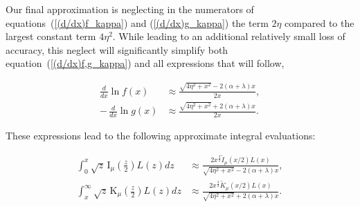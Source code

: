 \documentclass[draft]{agujournal2019}
\begin{document}
{Our final approximation is neglecting in the numerators of
equations~(\ref{(d/dx)f_kappa}) and (\ref{(d/dx)g_kappa}) the term 
$2\eta$ compared to the largest constant term $4\eta^{2}$. While leading to an
additional relatively small loss of accuracy, this neglect will significantly simplify
both equation~(\ref{(d/dx)f,g_kappa}) and all expressions that will follow,
\begin{linenomath*}
\begin{subequations}
\label{(d/dx)f,g_kappa_simplified}
\begin{align}
\frac{d}{dx}\ln f\left(  x\right)   &  \approx\frac{\sqrt{4\eta^{2}+x^{2}}-
2\left(  \alpha+\lambda\right)  x}{2x},\label{(d/dx)f_kappa_simplified}\\
-\,\frac{d}{dx}\ln g\left(  x\right)   &  \approx\frac{\sqrt{4\eta^{2}+x^{2}}+
2\left(  \alpha+\lambda\right)  x}{2x}. 
\label{(d/dx)g_kappa_simplified}
\end{align}
\end{subequations}
\end{linenomath*}
These expressions lead to the following approximate integral evaluations:
\begin{linenomath*}
\begin{align*}
\int_{0}^{x}\sqrt{z}\,\mathrm{I}_{\mu}\left(  \frac{z}{2}\right)  L(z)dz  &
\approx\frac{2x^{\frac{3}{2}}\tilde{I}_{\mu}(x/2)
L(x)}{\sqrt{4\eta^{2}+x^{2}}-2\left(  \alpha+\lambda\right)  x},\\
\int_{x}^{\infty}\sqrt{z}\,\mathrm{K}_{\mu}\left(  \frac{z}{2}\right)  L(z)dz
&  \approx\frac{2x^{\frac{3}{2}}\tilde{K}_{\mu}(x/2)
L(x)}{\sqrt{4\eta^{2}+x^{2}}+2\left(  \alpha+\lambda\right)  x}.
\end{align*}
\end{linenomath*}

}
\end{document}
